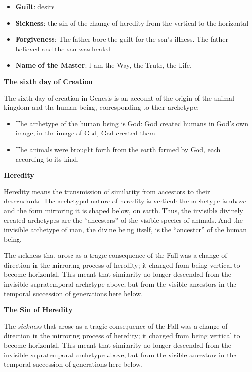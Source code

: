 \begin{itemize}
\item \textbf{Guilt}: desire 
\item \textbf{Sickness}: the sin of the change of heredity from the vertical to the horizontal 
\item \textbf{Forgiveness}: The father bore the guilt for the son's illness. The father believed
and the son was healed. 
\item \textbf{Name of the Master}: I am the Way, the Truth, the Life. 
\end{itemize}
\textbf{The sixth day of Creation}

The sixth day of creation in Genesis is an account of the origin of the animal kingdom and the human being,
corresponding to their archetype:

\begin{itemize}
\item The archetype of the human being is God: God created humans in God's own image, in the image
of God, God created them. 
\item The animals were brought forth from the earth formed by God, each according to its kind. 
\end{itemize}
\textbf{Heredity}

Heredity means the transmission of similarity from ancestors to their descendants. The archetypal nature of heredity is
vertical: the archetype is above and the form mirroring it is shaped below, on earth. Thus, the invisible divinely
created archetypes are the “ancestors” of the visible species of animals. And the invisible archetype of man, the
divine being itself, is the “ancestor” of the human being.

The sickness that arose as a tragic consequence of the Fall was a change of direction in the mirroring process of
heredity; it changed from being vertical to become horizontal. This meant that similarity no longer descended from the
invisible supratemporal archetype above, but from the visible ancestors in the temporal succession of generations here
below.

\textbf{The Sin of Heredity}

The \emph{sickness} that arose as a tragic consequence of the Fall was a change of direction in the mirroring process of
heredity; it changed from being vertical to become horizontal. This meant that similarity no longer descended from the
invisible supratemporal archetype above, but from the visible ancestors in the temporal succession of generations here
below.

